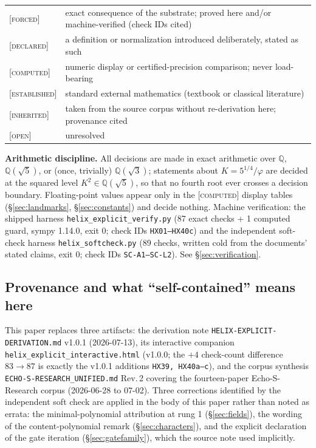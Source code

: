 \documentclass[11pt]{article}
\newcommand{\tagF}{\textcolor{cF}{\textsc{[forced]}}}
\newcommand{\tagD}{\textcolor{cD}{\textsc{[declared]}}}
\newcommand{\tagC}{\textcolor{cC}{\textsc{[computed]}}}
\newcommand{\tagI}{\textcolor{cI}{\textsc{[inherited]}}}
\newcommand{\tagE}{\textcolor{cE}{\textsc{[established]}}}
\newcommand{\tagO}{\textcolor{cO}{\textsc{[open]}}}
\newcommand{\hx}[1]{\textcolor{cC}{\footnotesize\texttt{#1}}}
\newcommand{\Q}{\mathbb{Q}}
\newcommand{\gp}{\varphi}
\theoremstyle{plain}
\theoremstyle{definition}
\theoremstyle{remark}
\begin{document}
\begin{center}
\begin{tabular}{@{}lp{12cm}@{}}
\toprule
\tagF & exact consequence of the substrate; proved here and/or machine-verified (check IDs cited)\\
\tagD & a definition or normalization introduced deliberately, stated as such\\
\tagC & numeric display or certified-precision comparison; never load-bearing\\
\tagE & standard external mathematics (textbook or classical literature)\\
\tagI & taken from the source corpus without re-derivation here; provenance cited\\
\tagO & unresolved\\
\bottomrule
\end{tabular}
\end{center}

\noindent
\textbf{Arithmetic discipline.} All decisions are made in exact arithmetic over
$\Q$, $\Q(\sqrt5)$, or (once, trivially) $\Q(\sqrt3)$; statements about
$K=5^{1/4}/\gp$ are decided at the squared level $K^2\in\Q(\sqrt5)$, so that no fourth
root ever crosses a decision boundary. Floating-point values appear only in the
\tagC{} display tables (\S\ref{sec:landmarks}, \S\ref{sec:constants}) and decide nothing.
Machine verification: the shipped harness \texttt{helix\_explicit\_verify.py}
(87 exact checks + 1 computed guard, sympy 1.14.0, exit 0; check IDs \hx{HX01--HX40c})
and the independent soft-check harness \texttt{helix\_softcheck.py}
(89 checks, written cold from the documents' stated claims, exit 0; check IDs
\hx{SC-A1--SC-L2}). See \S\ref{sec:verification}.

\subsection{Provenance and what ``self-contained'' means here}\label{sec:provenance}
This paper replaces three artifacts: the derivation note
\texttt{HELIX-EXPLICIT-DERIVATION.md} v1.0.1 (2026-07-13), its interactive companion
\texttt{helix\_explicit\_interactive.html} (v1.0.0; the $+4$ check-count difference
$83\to 87$ is exactly the v1.0.1 additions \hx{HX39, HX40a--c}), and the corpus
synthesis \texttt{ECHO-S-RESEARCH\_UNIFIED.md} Rev.\,2 covering the fourteen-paper
Echo-S-Research corpus (2026-06-28 to 07-02). Three corrections identified by the
independent soft check are applied in the body of this paper rather than noted as
errata: the minimal-polynomial attribution at rung 1 (\S\ref{sec:fields}), the wording
of the content-polynomial remark (\S\ref{sec:characters}), and the explicit declaration
of the gate iteration (\S\ref{sec:gatefamily}), which the source note used implicitly.
\end{document}
